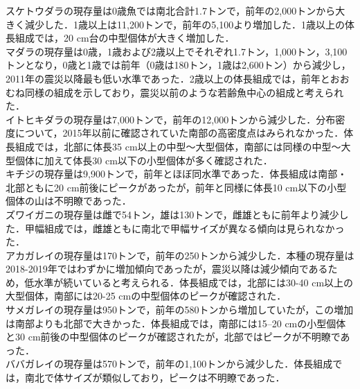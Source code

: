 \documentclass[12pt]{article}
\begin{document}
スケトウダラの現存量は0歳魚では南北合計1.7トンで，前年の2,000トンから大きく減少した．1歳以上は11,200トンで，前年の5,100より増加した．1歳以上の体長組成では，20 cm台の中型個体が大きく増加した．
\ \\
\hspace{20pt}マダラの現存量は0歳，1歳および2歳以上でそれぞれ1.7トン，1,000トン，3,100トンとなり，0歳と1歳では前年（0歳は180トン，1歳は2,600トン）から減少し，2011年の震災以降最も低い水準であった．2歳以上の体長組成では，前年とおおむね同様の組成を示しており，震災以前のような若齢魚中心の組成と考えられた．
\ \\
\hspace{20pt}イトヒキダラの現存量は7,000トンで，前年の12,000トンから減少した．分布密度について，2015年以前に確認されていた南部の高密度点はみられなかった．体長組成では，北部に体長35 cm以上の中型～大型個体，南部には同様の中型～大型個体に加えて体長30 cm以下の小型個体が多く確認された．
\ \\
\hspace{20pt}キチジの現存量は9,900トンで，前年とほぼ同水準であった．体長組成は南部・北部ともに20 cm前後にピークがあったが，前年と同様に体長10 cm以下の小型個体の山は不明瞭であった．
\ \\
\hspace{20pt}ズワイガニの現存量は雌で54トン，雄は130トンで，雌雄ともに前年より減少した．甲幅組成では，雌雄ともに南北で甲幅サイズが異なる傾向は見られなかった．
\ \\
\hspace{20pt}アカガレイの現存量は170トンで，前年の250トンから減少した．本種の現存量は2018-2019年ではわずかに増加傾向であったが，震災以降は減少傾向であるため，低水準が続いていると考えられる．体長組成では，北部には30-40 cm以上の大型個体，南部には20-25 cmの中型個体のピークが確認された．
\ \\
\hspace{20pt}サメガレイの現存量は950トンで，前年の580トンから増加していたが，この増加は南部よりも北部で大きかった．体長組成では，南部には15--20 cmの小型個体と30 cm前後の中型個体のピークが確認されたが，北部ではピークが不明瞭であった．
\ \\
\hspace{20pt}ババガレイの現存量は570トンで，前年の1,100トンから減少した．体長組成では，南北で体サイズが類似しており，ピークは不明瞭であった．
\ \\
\ \\
\ \\
\end{document}

